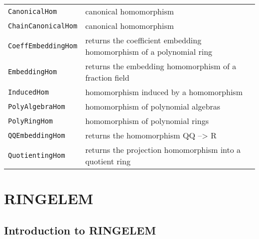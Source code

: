 \documentclass[a4paper]{mybook}
\begin{document}
\begin{center}
\begin{longtable}{ll}
   
{\verb~CanonicalHom~} &
      canonical homomorphism\\
   
{\verb~ChainCanonicalHom~} &
      canonical homomorphism\\
   
{\verb~CoeffEmbeddingHom~} &
      returns the coefficient embedding homomorphism of a polynomial ring\\
   
{\verb~EmbeddingHom~} &
      returns the embedding homomorphism of a fraction field\\
   
{\verb~InducedHom~} &
      homomorphism induced by a homomorphism\\
   
{\verb~PolyAlgebraHom~} &
      homomorphism of polynomial algebras\\
   
{\verb~PolyRingHom~} &
      homomorphism of polynomial rings\\
   
{\verb~QQEmbeddingHom~} &
      returns the homomorphism QQ --> R\\
   
{\verb~QuotientingHom~} &
      returns the projection homomorphism into a quotient ring\\
   
\end{longtable}
\end{center}

\noindent



\chapter{RINGELEM}
\label{RINGELEM}

      

\section{Introduction to RINGELEM}
\label{Introduction to RINGELEM}
\end{document}
